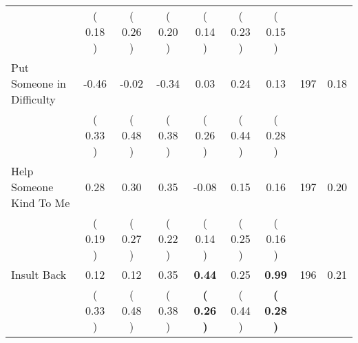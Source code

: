 \begin{tabular}{lcccccccc}
 & (     0.18 ) & (     0.26 ) & (     0.20 ) & (     0.14 ) & (     0.23 ) & (     0.15 ) & \\
Put Someone in Difficulty &     -0.46 &     -0.02 &     -0.34 &      0.03 &      0.24 &      0.13 & 197 &       0.18 \\ 
 & (     0.33 ) & (     0.48 ) & (     0.38 ) & (     0.26 ) & (     0.44 ) & (     0.28 ) & \\
Help Someone Kind To Me &      0.28 &      0.30 &      0.35 &     -0.08 &      0.15 &      0.16 & 197 &       0.20 \\ 
 & (     0.19 ) & (     0.27 ) & (     0.22 ) & (     0.14 ) & (     0.25 ) & (     0.16 ) & \\
Insult Back &      0.12 &      0.12 &      0.35 & \textbf{     0.44} &      0.25 & \textbf{     0.99} & 196 &       0.21 \\ 
 & (     0.33 ) & (     0.48 ) & (     0.38 ) & \textbf{(     0.26 )} & (     0.44 ) & \textbf{(     0.28 )} & \\
\bottomrule
\end{tabular}
